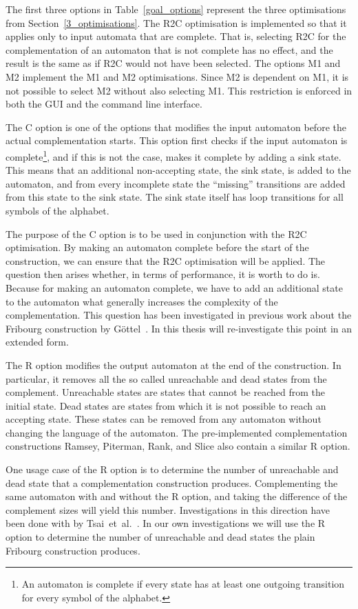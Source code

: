 The first three options in Table~\ref{goal_options} represent the three optimisations from Section~\ref{3_optimisations}. The R2C optimisation is implemented so that it applies only to input automata that are complete. That is, selecting R2C for the complementation of an automaton that is not complete has no effect, and the result is the same as if R2C would not have been selected. The options M1 and M2 implement the M1 and M2 optimisations. Since M2 is dependent on M1, it is not possible to select M2 without also selecting M1. This restriction is enforced in both the GUI and the command line interface.

The C option is one of the options that modifies the input automaton before the actual complementation starts. This option first checks if the input automaton is complete\footnote{An automaton is complete if every state has at least one outgoing transition for every symbol of the alphabet.}, and if this is not the case, makes it complete by adding a sink state. This means that an additional non-accepting state, the sink state, is added to the automaton, and from every incomplete state the ``missing'' transitions are added from this state to the sink state. The sink state itself has loop transitions for all symbols of the alphabet.

The purpose of the C option is to be used in conjunction with the R2C optimisation. By making an automaton complete before the start of the construction, we can ensure that the R2C optimisation will be applied. The question then arises whether, in terms of performance, it is worth to do is. Because for making an automaton complete, we have to add an additional state to the automaton what generally increases the complexity of the complementation. This question has been investigated in previous work about the Fribourg construction by Göttel~\cite{2013_bsc_goettel}. In this thesis will re-investigate this point in an extended form.

The R option modifies the output automaton at the end of the construction. In particular, it removes all the so called unreachable and dead states from the complement. Unreachable states are states that cannot be reached from the initial state. Dead states are states from which it is not possible to reach an accepting state. These states can be removed from any automaton without changing the language of the automaton. The pre-implemented complementation constructions Ramsey, Piterman, Rank, and Slice also contain a similar R option.

One usage case of the R option is to determine the number of unreachable and dead state that a complementation construction produces. Complementing the same automaton with and without the R option, and taking the difference of the complement sizes will yield this number. Investigations in this direction have been done with \goal{} by Tsai~et~al.~\cite{2011_tsai}. In our own investigations we will use the R option to determine the number of unreachable and dead states the plain Fribourg construction produces.


